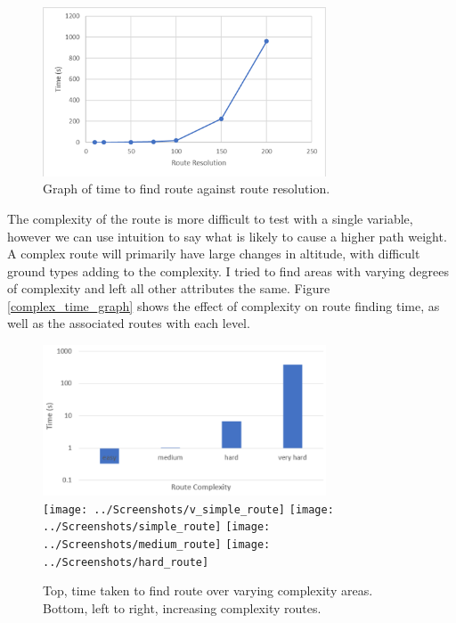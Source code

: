 \documentclass[12pt,a4paper]{article}
\begin{document}
  \begin{figure}[htb]
    \centering
    \includegraphics[width=0.75\textwidth]{resolution_time_graph}
    \caption{Graph of time to find route against route resolution.}
    \label{resolution_time_graph}
  \end{figure}

  \par The complexity of the route is more difficult to test with a single variable, however we can use intuition to say what is likely to cause a higher path weight. A complex route will primarily have large changes in altitude, with difficult ground types adding to the complexity. I tried to find areas with varying degrees of complexity and left all other attributes the same. Figure \ref{complex_time_graph} shows the effect of complexity on route finding time, as well as the associated routes with each level.

  \begin{figure}[htb]
    \centering
    \includegraphics[width=0.75\textwidth]{route_complex_time_graph}\\
    \centering
    \texttt{[image: ../Screenshots/v\_simple\_route]}
    \texttt{[image: ../Screenshots/simple\_route]}
    \texttt{[image: ../Screenshots/medium\_route]}
    \texttt{[image: ../Screenshots/hard\_route]}\\
    \centering
    \caption{Top, time taken to find route over varying complexity areas. Bottom, left to right, increasing complexity routes.}
  \end{figure}
\end{document}
